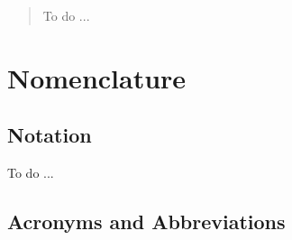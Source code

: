 \begin{abstract}
To do ... 
\end{abstract}

\chapter*{Nomenclature}\label{ch:symbols}

\section*{Notation}
\label{sec:notation}

To do ...

\section*{Acronyms and Abbreviations}
\label{sec:acronyms}

